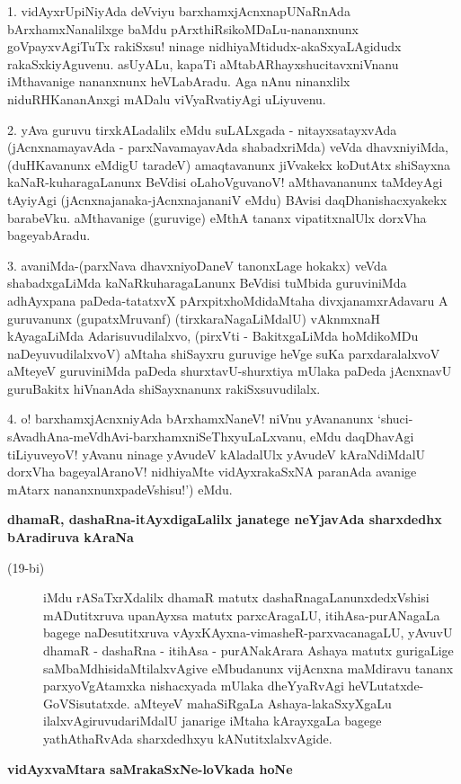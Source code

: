 \begin{artha}
1. vidAyxrUpiNiyAda deVviyu barxhamxjAcnxnapUNaRnAda bArxhamxNanalilxge baMdu pArxthiRsikoMDaLu-\-nananxnunx goVpayxvAgiTuTx rakiSxsu! ninage nidhiyaMtidudx-akaSxya\-LAgidudx rakaSxkiyAguvenu. asU\-yALu, kapaTi aMtabARhayxshucitavxniVnanu iMthavanige nananxnunx heVLabAradu. Aga nAnu ninanxlilx niduRHKa\-nanAnxgi mADalu viVyaRvatiyAgi uLiyuvenu.
\end{artha}

\begin{artha}
2. yAva guruvu tirxkALadalilx eMdu suLALxgada - nitayxsatayxvAda (jAcnxnamayavAda - parxNava\-maya\-vAda shabadxriMda) veVda dhavxniyiMda, (duHKavanunx eMdigU taradeV) amaqtavanunx jiVvakekx koDu\-tAtx shiSayxna kaNaR-kuharagaLanunx BeVdisi oLahoVguvanoV! aMthavananunx taMdeyAgi tAyi\-yAgi (jAcnxnajanaka-jAcnxnajananiV eMdu) BAvisi daqDhanishacxyakekx barabeVku. aMthavanige (guru\-vige) eMthA tananx vipatitxnalUlx dorxVha bageyabAradu.
\end{artha}

\begin{artha}
3. avaniMda-(parxNava dhavxniyoDaneV tanonxLage hokakx) veVda shabadxgaLiMda kaNaR\-kuharagaLanunx BeVdisi tuMbida guruviniMda adhAyxpana paDeda-tatatxvX pArxpitxhoMdidaMtaha divxjanamxrAdavaru A guruvanunx (gupatxM\-ruvanf) (tirxkaraNagaLiMdalU) vAknmxnaH kAyagaLiMda Adarisuvudilalxvo, (pirxVti - Bakitx\-gaLiMda hoMdi\-koMDu naDeyuvudilalxvoV) aMtaha shiSayxru guruvige heVge suKa parxda\-ralalxvoV aMteyeV guruviniMda paDeda shurxtavU-shurxtiya mUlaka paDeda jAcnxnavU guru\-Bakitx hiVnanAda shiSayxnanunx rakiSx\-suvudilalx.
\end{artha}

\begin{artha}
4. o! barxhamxjAcnxniyAda bArxhamxNaneV! niVnu yAvananunx `shuci-sAvadhAna-\-meVdhAvi-barxhamxniSeThx\-yuLaLx\-vanu, eMdu daqDhavAgi tiLiyuveyoV! yAvanu ninage yAvudeV kAladalUlx yAvudeV kAraNdiMdalU dorxVha bageyalAranoV! nidhiyaMte vidAyxrakaSxNA paranAda avanige mAtarx nananxnunxpadeVshisu!') eMdu.
\end{artha}

\newpage

{\bigskip
\noindent
{\large\bf dhamaR, dashaRna-itAyxdigaLalilx janatege neYjavAda sharxdedhx bAradiruva kAraNa}}\label{page50}
\begin{description}
\item[(19-bi)] iMdu rASaTxrXdalilx dhamaR matutx dashaRnagaLanunxdedxVshisi mADutitxruva upanAyxsa matutx parxcAra\-gaLU, itihAsa-purANagaLa bagege naDesutitxruva vAyxKAyxna-vimasheR-parxvacanagaLU, yAvuvU dhamaR - dashaRna - itihAsa - purANakArara Ashaya matutx gurigaLige saMbaMdhisidaMtilalx\-vAgive \-eMbudanunx vijAcnxna maMdiravu tananx parxyoVgAtamxka nishacxyada mUlaka dheYyaRvAgi heVLu\-tatxde-GoVSisutatxde. aMteyeV mahaSiRgaLa Ashaya-lakaSxyXgaLu ilalxvAgiruvudariMdalU jana\-rige iMtaha kArayxgaLa bagege yathAthaRvAda sharxdedhxyu kANutitxlalxvAgide.
\end{description}
{\medskip
\noindent
{\large\bf vidAyxvaMtara saMrakaSxNe-loVkada hoNe}}
\medskip

